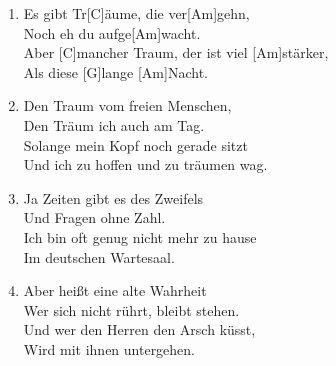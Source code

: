\def\Titel{Es gibt Träume}
\def\Interpret{Sigi Becker (RAK)}
\def\Referenz{text}

\LiedSetup{}

\begin{guitarMagic}
    \begin{enumerate}

        \item Es gibt Tr[C]{äu}me, die ver[Am]gehn,\\
            [C] Noch eh du aufge[Am]wacht.\\
            Aber [C]mancher Traum, der ist viel [Am]stärker,\\
            [F] Als diese [G]lange [Am]Nacht.

        \item Den Traum vom freien Menschen,\\
            Den Träum ich auch am Tag.\\
            Solange mein Kopf noch gerade sitzt\\
            Und ich zu hoffen und zu träumen wag.\\

        \item Ja Zeiten gibt es des Zweifels\\
            Und Fragen ohne Zahl.\\
            Ich bin oft genug nicht mehr zu hause\\
            Im deutschen Wartesaal.\\

        \item Aber heißt eine alte Wahrheit\\
            Wer sich nicht rührt, bleibt stehen.\\
            Und wer den Herren den Arsch küsst,\\
            Wird mit ihnen untergehen.\\
    \end{enumerate}
\end{guitarMagic}
